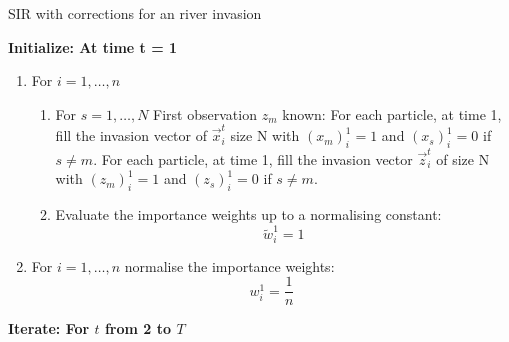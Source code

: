 \begin{algorithm}[H]
\caption{SIR with corrections for an river invasion}\label{euclid}
 \begin{algorithmic}

 \State  \bf{Initialize:} \normalfont At time t = 1
            
\begin{enumerate}
	\item For $i = 1, \dots , n$
	\begin{enumerate}
	    \item For $s = 1, \dots, N$
		First observation $z_m$ known: For each particle, at time 1, fill the invasion vector of $\vec{x}_i^t$ size N with $(x_{m})^1_i = 1$ and $(x_{s})^1_i = 0$ if $s \neq m$. 
		For each particle, at time 1, fill the invasion vector $\vec{z}_i^t$ of size N with $(z_m)^1_i = 1$ and $(z_{s})^1_i = 0$ if $s \neq m$.
		\item Evaluate the importance weights up to a normalising constant:
		\[
		\tilde{w}^{1}_{i} = 1
		\]
	\end{enumerate}
	\item For $i = 1, \dots , n$ normalise the importance weights: 
	\[
	w^{1}_{i} = \frac{1}{n}
	\]
\end{enumerate}

 \State  \bf{Iterate:} \normalfont For $t$ from 2 to $T$


\end{algorithmic}
\end{algorithm}
